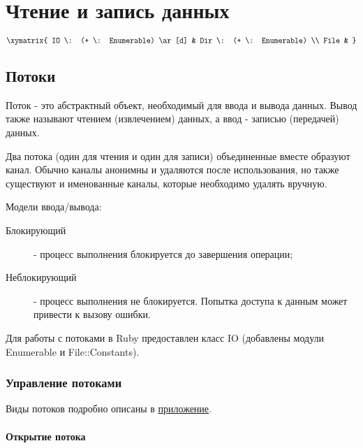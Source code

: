 \chapter{Чтение и запись данных}

$$
  \xymatrix{  
  IO \: (+ \: Enumerable) \ar[d] & Dir \: (+ \: Enumerable) \\
  File & }
$$

\section{Потоки}

Поток - это абстрактный объект, необходимый для ввода и вывода данных. Вывод также называют чтением (извлечением) данных, а ввод - записью (передачей) данных.

Два потока (один для чтения и один для записи) объединенные вместе образуют канал. Обычно каналы анонимны и удаляются после использования, но также существуют и именованные каналы, которые необходимо удалять вручную.

Модели ввода/вывода:
\begin{description}
  \item[Блокирующий] - процесс выполнения блокируется до завершения операции;
  \item[Неблокирующий] - процесс выполнения не блокируется. Попытка доступа к данным может привести к вызову ошибки. 
\end{description}


Для работы с потоками в Ruby предоставлен класс IO (добавлены модули Enumerable и File::Constants).

\subsection{Управление потоками}

Виды потоков подробно описаны в \hyperlink{appio}{\underline{приложение}}.

\subsubsection*{Открытие потока}

